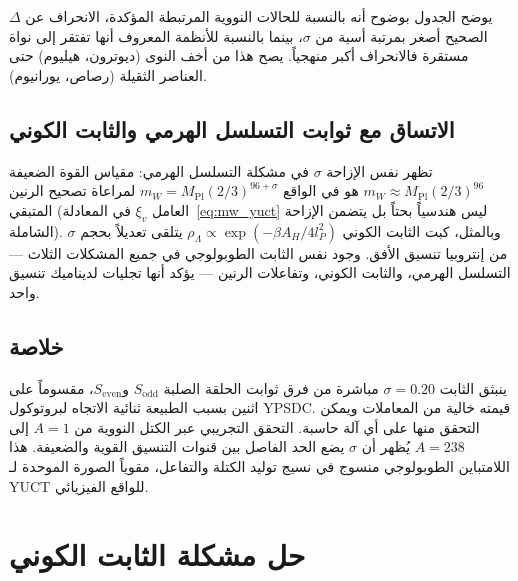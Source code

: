 \documentclass[12pt,a4paper]{article}
\begin{document}
	يوضح الجدول بوضوح أنه بالنسبة للحالات النووية المرتبطة المؤكدة، الانحراف عن \(\Delta\) الصحيح أصغر بمرتبة أسية من \(\sigma\)، بينما بالنسبة للأنظمة المعروف أنها تفتقر إلى نواة مستقرة فالانحراف أكبر منهجياً. يصح هذا من أخف النوى (ديوترون، هيليوم) حتى العناصر الثقيلة (رصاص، يورانيوم).
	
	\subsection{الاتساق مع ثوابت التسلسل الهرمي والثابت الكوني}
	
	تظهر نفس الإزاحة \(\sigma\) في مشكلة التسلسل الهرمي: مقياس القوة الضعيفة \(m_W \approx M_{\mathrm{Pl}}(2/3)^{96}\) هو في الواقع \(m_W = M_{\mathrm{Pl}} (2/3)^{96+\sigma}\) لمراعاة تصحيح الرنين المتبقي (العامل \(\xi_v\) في المعادلة~\ref{eq:mw_yuct} ليس هندسياً بحتاً بل يتضمن الإزاحة الشاملة). وبالمثل، كبت الثابت الكوني \(\rho_\Lambda \propto \exp(-\beta A_H/4l_P^2)\) يتلقى تعديلاً بحجم \(\sigma\) من إنتروبيا تنسيق الأفق. وجود نفس الثابت الطوبولوجي في جميع المشكلات الثلاث — التسلسل الهرمي، والثابت الكوني، وتفاعلات الرنين — يؤكد أنها تجليات لديناميك تنسيق واحد.
	
	\subsection{خلاصة}
	
	ينبثق الثابت \(\sigma = 0.20\) مباشرة من فرق ثوابت الحلقة الصلبة \(S_{\mathrm{odd}}\) و\(S_{\mathrm{even}}\)، مقسوماً على اثنين بسبب الطبيعة ثنائية الاتجاه لبروتوكول YPSDC. قيمته خالية من المعاملات ويمكن التحقق منها على أي آلة حاسبة. التحقق التجريبي عبر الكتل النووية من \(A=1\) إلى \(A=238\) يُظهر أن \(\sigma\) يضع الحد الفاصل بين قنوات التنسيق القوية والضعيفة. هذا اللامتباين الطوبولوجي منسوج في نسيج توليد الكتلة والتفاعل، مقوياً الصورة الموحدة لـ YUCT للواقع الفيزيائي.
	
	\section{حل مشكلة الثابت الكوني}
	
\end{document}
